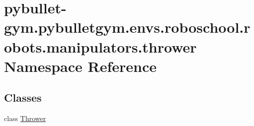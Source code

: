 \hypertarget{namespacepybullet-gym_1_1pybulletgym_1_1envs_1_1roboschool_1_1robots_1_1manipulators_1_1thrower}{}\section{pybullet-\/gym.pybulletgym.\+envs.\+roboschool.\+robots.\+manipulators.\+thrower Namespace Reference}
\label{namespacepybullet-gym_1_1pybulletgym_1_1envs_1_1roboschool_1_1robots_1_1manipulators_1_1thrower}
\subsection*{Classes}
\begin{DoxyCompactItemize}
\item 
class \hyperlink{classpybullet-gym_1_1pybulletgym_1_1envs_1_1roboschool_1_1robots_1_1manipulators_1_1thrower_1_1_thrower}{Thrower}
\end{DoxyCompactItemize}
